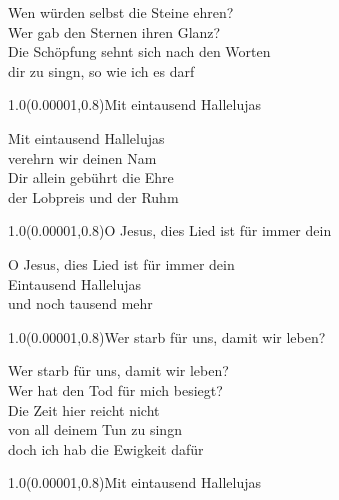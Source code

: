 \documentclass[aspectratio=169]{beamer}
\begin{document}
\color{white}
\begin{frame}
\centering
\color{white}
\huge{Wen würden selbst die Steine ehren?} \\
\huge{Wer gab den Sternen ihren Glanz?} \\
\huge{Die Schöpfung sehnt sich nach den Worten} \\
\huge{dir zu singn, so wie ich es darf} \\

\begin{textblock}{1.0}(0.00001,0.8)\color{gray}\normalsize{Mit eintausend Hallelujas}\end{textblock}
\end{frame}

\begin{frame}
\centering
\color{white}
\huge{Mit eintausend Hallelujas} \\
\huge{verehrn wir deinen Nam} \\
\huge{Dir allein gebührt die Ehre} \\
\huge{der Lobpreis und der Ruhm} \\

\begin{textblock}{1.0}(0.00001,0.8)\color{gray}\normalsize{O Jesus, dies Lied ist für immer dein}\end{textblock}
\end{frame}

\begin{frame}
\centering
\color{white}
\huge{O Jesus, dies Lied ist für immer dein} \\
\huge{Eintausend Hallelujas} \\
\huge{und noch tausend mehr} \\

\begin{textblock}{1.0}(0.00001,0.8)\color{gray}\normalsize{Wer starb für uns, damit wir leben?}\end{textblock}
\end{frame}

\begin{frame}
\centering
\color{white}
\huge{Wer starb für uns, damit wir leben?} \\
\huge{Wer hat den Tod für mich besiegt?} \\
\huge{Die Zeit hier reicht nicht} \\
\huge{von all deinem Tun zu singn} \\
\huge{doch ich hab die Ewigkeit dafür} \\

\begin{textblock}{1.0}(0.00001,0.8)\color{gray}\normalsize{Mit eintausend Hallelujas}\end{textblock}
\end{frame}
\end{document}
